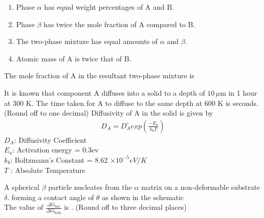 \begin{enumerate}

        \item Phase $\alpha$ has equal weight percentages of A and B.
        \item Phase $\beta$ has twice the mole fraction of A compared to B.
        \item The two-phase mixture has equal amounts of $\alpha$ and $\beta$.
        \item Atomic mass of A is twice that of B.
    
\end{enumerate}
The mole fraction of A in the resultant two-phase mixture is \underline{\hspace{1cm}}
\bigskip
\item It is known that component A diffuses into a solid to a depth of $10 \, \mu$m in 1 hour at 300 K. The time taken for A to diffuse to the same depth at 600 K is \underline{\hspace{1cm}} seconds. (Round off to one decimal)
Diffusivity of A in the solid is given by 
\begin{align*}
    D_{A}=D_{A}^\circ exp(\frac{-E_{a}}{k_b T})
\end{align*}
$D_{A}$: Diffusivity Coefficient \\
$E_a$: Activation energy = 0.3ev \\
$k_b$: Boltzmann's Constant = 8.62 $\times 10^{-5} eV/K$\\
$T$ : Absolute Temperature 
\bigskip
\item A spherical $\beta$ particle nucleates from the $\alpha$ matrix on a non-deformable substrate $\delta$. forming a contact angle of $\theta$ as shown in the schematic\\
	The value of $\frac{\Delta \text{G}_{\text{het}}}{\Delta \text{G}_{\text{hom}}}$ is \underline{\hspace{1cm}}. (Round off to three decimal places)
\begin{figure}[H]
\centering
{}%

\end{figure}
